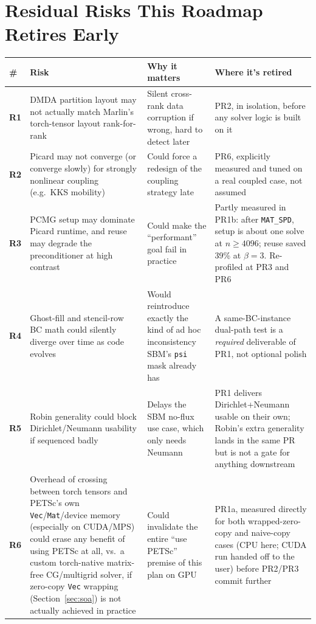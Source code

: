 \documentclass[11pt]{article}
\begin{document}
\section{Residual Risks This Roadmap Retires Early}
\label{sec:risks}

\begin{longtable}{>{\bfseries}p{} p{} p{} p{}}
\toprule
\# & Risk & Why it matters & Where it's retired \\
\midrule
\endhead
R1 & DMDA partition layout may not actually match Marlin's torch-tensor
layout rank-for-rank & Silent cross-rank data corruption if wrong, hard to
detect later & PR2, in isolation, before any solver logic is built on it \\
R2 & Picard may not converge (or converge slowly) for strongly nonlinear
coupling (e.g.\ KKS mobility) & Could force a redesign of the coupling
strategy late & PR6, explicitly measured and tuned on a real coupled case,
not assumed \\
R3 & PCMG setup may dominate Picard runtime, and reuse may degrade the
preconditioner at high contrast & Could make the ``performant'' goal fail
in practice & Partly measured in PR1b: after \texttt{MAT\_SPD}, setup
is about one solve at $n\ge4096$; reuse saved 39\% at $\beta=3$. Re-profiled at PR3
and PR6 \\
R4 & Ghost-fill and stencil-row BC math could silently diverge over time as
code evolves & Would reintroduce exactly the kind of ad hoc inconsistency
SBM's \texttt{psi} mask already has & A same-BC-instance dual-path test is
a \textit{required} deliverable of PR1, not optional polish \\
R5 & Robin generality could block Dirichlet/Neumann usability if sequenced
badly & Delays the SBM no-flux use case, which only needs Neumann & PR1
delivers Dirichlet+Neumann usable on their own; Robin's extra generality
lands in the same PR but is not a gate for anything downstream \\
R6 & Overhead of crossing between torch tensors and PETSc's own
\texttt{Vec}/\texttt{Mat}/device memory (especially on CUDA/MPS) could
erase any benefit of using PETSc at all, vs.\ a custom torch-native
matrix-free CG/multigrid solver, if zero-copy \texttt{Vec} wrapping
(Section~\ref{sec:soa}) is not actually achieved in practice & Could
invalidate the entire ``use PETSc'' premise of this plan on GPU & PR1a,
measured directly for both wrapped-zero-copy and naive-copy cases (CPU
here; CUDA run handed off to the user) before PR2/PR3 commit further

\end{longtable}
\end{document}
